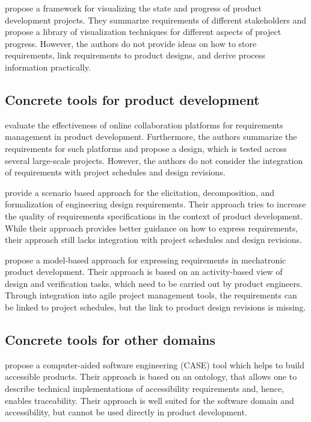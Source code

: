 \cite{RICHTER2020271} propose a framework for visualizing the state and progress of product development projects.
They summarize requirements of different stakeholders and propose a library of visualization techniques for different aspects of project progress.
However, the authors do not provide ideas on how to store requirements, link requirements to product designs, and derive process information practically.

\subsection{Concrete tools for product development}

\cite{Ahti2005} evaluate the effectiveness of online collaboration platforms for requirements management in product development.
Furthermore, the authors summarize the requirements for such platforms and propose a design, which is tested across several large-scale projects.
However, the authors do not consider the integration of requirements with project schedules and design revisions.

\cite{liu2012scenario} provide a scenario based approach for the elicitation, decomposition, and formalization of engineering design requirements.
Their approach tries to increase the quality of requirements specifications in the context of product development.
While their approach provides better guidance on how to express requirements, their approach still lacks integration with project schedules and design revisions.

\cite{WINDISCH2022550} propose a model-based approach for expressing requirements in mechatronic product development.
Their approach is based on an activity-based view of design and verification tasks, which need to be carried out by product engineers.
Through integration into agile project management tools, the requirements can be linked to project schedules, but the link to product design revisions is missing.

\subsection{Concrete tools for other domains}

\cite{6976693} propose a computer-aided software engineering (CASE) tool which helps to build accessible products.
Their approach is based on an ontology, that allows one to describe technical implementations of accessibility requirements and, hence, enables traceability.
Their approach is well suited for the software domain and accessibility, but cannot be used directly in product development.

